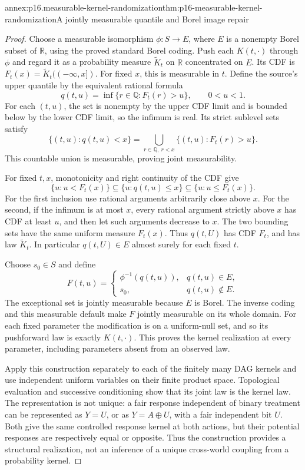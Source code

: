 \begin{annexitem}{annex:p16.measurable-kernel-randomization}{thm:p16-measurable-kernel-randomization}{A jointly measurable quantile and Borel image repair}
\begin{proof}
Choose a measurable isomorphism \(\phi:S\to E\), where \(E\) is a
nonempty Borel subset of \(\mathbb R\), using the proved standard
Borel coding. Push each \(K(t,\cdot)\) through \(\phi\) and regard
it as a probability measure \(\widetilde K_t\) on \(\mathbb R\)
concentrated on \(E\). Its CDF is
\(F_t(x)=\widetilde K_t(( -\infty,x])\). For fixed \(x\), this
is measurable in \(t\). Define the source's upper quantile by the
equivalent rational formula
\[
 q(t,u)=\inf\{r\in\mathbb Q:F_t(r)>u\},\qquad 0<u<1.
\]
For each \((t,u)\), the set is nonempty by the upper CDF limit and
is bounded below by the lower CDF limit, so the infimum is real.
Its strict sublevel sets satisfy
\[
 \{(t,u):q(t,u)<x\}
   =\bigcup_{r\in\mathbb Q,\ r<x}\{(t,u):F_t(r)>u\}.
\]
This countable union is measurable, proving joint measurability.

For fixed \(t,x\), monotonicity and right continuity of the CDF give
\[
 \{u:u<F_t(x)\}\subseteq\{u:q(t,u)\leq x\}
                  \subseteq\{u:u\leq F_t(x)\}.
\]
For the first inclusion use rational arguments arbitrarily close above
\(x\). For the second, if the infimum is at most \(x\), every rational
argument strictly above \(x\) has CDF at least \(u\), and then let
such arguments decrease to \(x\). The two bounding sets have the same
uniform measure \(F_t(x)\). Thus \(q(t,U)\) has CDF \(F_t\), and
has law \(\widetilde K_t\). In particular \(q(t,U)\in E\) almost
surely for each fixed \(t\).

Choose \(s_0\in S\) and define
\[
 F(t,u)=\begin{cases}\phi^{-1}(q(t,u)),&q(t,u)\in E,\\
                         s_0,&q(t,u)\notin E.\end{cases}
\]
The exceptional set is jointly measurable because \(E\) is Borel.
The inverse coding and this measurable default make \(F\) jointly
measurable on its whole domain. For each fixed parameter the modification
is on a uniform-null set, and so its pushforward law is exactly
\(K(t,\cdot)\). This proves the kernel realization at every parameter,
including parameters absent from an observed law.

Apply this construction separately to each of the finitely many DAG
kernels and use independent uniform variables on their finite product
space. Topological evaluation and successive conditioning show that its
joint law is the kernel law. The representation is not unique: a fair
response independent of binary treatment can be represented as
\(Y=U\), or as \(Y=A\oplus U\), with a fair independent bit \(U\).
Both give the same controlled response kernel at both actions, but
their potential responses are respectively equal or opposite. Thus
the construction provides a structural realization, not an inference
of a unique cross-world coupling from a probability kernel.
\end{proof}
\end{annexitem}


